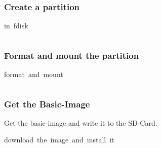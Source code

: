 \documentclass[11pt, a4paper,ngerman]{article}
\begin{document}
\subsubsection{Create a partition}

\begin{mintedbox}[breakable=true,
 bottomrule=0.5mm,
 width=\paperwidth-3cm,
 boxsep=1mm, 
 enhanced=true,
 colframe = monoblack,
 drop fuzzy shadow,
 colback = black
 ]{in\ fdisk}%
 

     \inputminted[firstline=13,lastline=15, 
     linenos=true, framesep=2mm, mathescape, numbersep=5pt,tabsize=4,%
]{bash}{includes/archlinux.sh}%

\end{mintedbox}%
\vspace{-0.4cm}

\subsubsection{Format and mount the partition}

\begin{mintedbox}[breakable=true,
 bottomrule=0.5mm,
 width=\paperwidth-3cm,
 boxsep=1mm, 
 enhanced=true,
 colframe = monoblack,
 drop fuzzy shadow,
 colback = black
 ]{format\ and\ mount}%
 

     \inputminted[firstline=21,lastline=22, 
     linenos=true, framesep=2mm, mathescape, numbersep=5pt,tabsize=4,%
]{bash}{includes/archlinux.sh}%

\end{mintedbox}%
\vspace{-0.4cm}

\subsubsection{Get the Basic-Image}

Get the basic-image and write it to the SD-Card. \\

\begin{mintedbox}[breakable=true,
 bottomrule=0.5mm,
 width=\paperwidth-3cm,
 boxsep=1mm, 
 enhanced=true,
 colframe = monoblack,
 drop fuzzy shadow,
 colback = black
 ]{download\ the\ image\ and\ install\ it}%
 

     \inputminted[firstline=28,lastline=31, 
     linenos=true, framesep=2mm, mathescape, numbersep=5pt,tabsize=4,%
]{bash}{includes/archlinux.sh}%

\end{mintedbox}%
\vspace{0.4cm}
\end{document}
